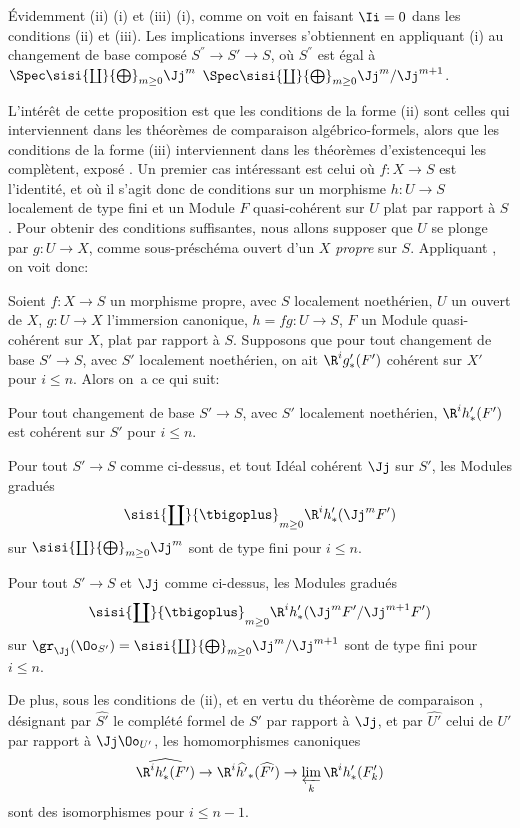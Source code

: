 \'Evidemment (ii) \ALORS (i) et (iii) \ALORS (i), comme on voit en faisant $\Ii=0$ dans les conditions (ii) et (iii). Les implications inverses s'obtiennent en appliquant (i) au changement de base compos\'e $S^{''}\to S'\to S$, o\`u $S^{''}$ est \'egal \`a $\Spec \sisi{\coprod}{\bigoplus}_{m\geq 0} \Jj^m$ \resp $\Spec \sisi{\coprod}{\bigoplus}_{m\geq 0} \Jj^m/\Jj^{m+1}$.

L'int\'er\^et de cette proposition est que les conditions de la forme (ii) sont celles qui interviennent dans les \og th\'eor\`emes de comparaison alg\'ebrico-formels\fg, alors que les conditions de la forme (iii) interviennent dans les \og th\'eor\`emes d'existence\fg qui les compl\`etent, \cf expos\'e . Un premier cas int\'eressant est celui o\`u $f:X\to S$ est l'identit\'e, et o\`u il s'agit donc de conditions sur un morphisme $h:U\to S$ localement de type fini et un Module $F$ quasi-coh\'erent sur $U$ plat par rapport \`a $S$. Pour obtenir des conditions suffisantes, nous allons supposer que $U$ se plonge par $g:U\to X$, comme sous-pr\'esch\'ema ouvert d'un $X$ \emph{propre} sur $S$. Appliquant , on voit donc:

\begin{corollaire} \label{XII.5.8}
Soient $f:X\to S$ un morphisme propre, avec $S$ localement noeth\'erien, $U$ un ouvert de $X$, $g:U\to X$ l'immersion canonique, $h=fg:U\to S$, $F$ un Module quasi-coh\'erent sur $X$, plat par rapport \`a $S$. Supposons que pour tout changement de base $S'\to S$, avec $S'$ localement noeth\'erien, on ait $\R^ig'_\ast(F')$ coh\'erent sur $X'$ pour $i\leq n$. Alors on~a ce qui suit:
\begin{enumeratei}
\item
Pour tout changement de base $S'\to S$, avec $S'$ localement noeth\'erien, $\R^ih'_\ast(F')$ est coh\'erent sur $S'$ pour $i\leq n$.
\item
Pour tout $S'\to S$ comme ci-dessus, et tout Id\'eal coh\'erent $\Jj$ sur $S'$, les Modules gradu\'es\pageoriginale
\[
\sisi{\coprod}{\tbigoplus}_{m\geq 0} \R^ih'_\ast(\Jj^mF')
\]
sur $\sisi{\coprod}{\bigoplus}_{m\geq 0}\Jj^m$ sont de type fini pour $i\leq n$.
\item
Pour tout $S'\to S$ et $\Jj$ comme ci-dessus, les Modules gradu\'es
\[
\sisi{\coprod}{\tbigoplus}_{m\geq 0} \R^ih'_\ast(\Jj^mF'/\Jj^{m+1}F')
\]
sur $\gr_\Jj(\Oo_{S'})=\sisi{\coprod}{\bigoplus}_{m\geq 0}\Jj^m/\Jj^{m+1}$ sont de type fini pour $i\leq n$.

De plus, sous les conditions de (ii), et en vertu du th\'eor\`eme de comparaison , d\'esignant par $\widehat{S'}$ le compl\'et\'e formel de $S'$ par rapport \`a $\Jj$, et par $\widehat{U'}$ celui de $U'$ par rapport \`a $\Jj\Oo_{U'}$, les homomorphismes canoniques
\[
\widehat{\R^ih'_\ast(F')} \to \R^i\widehat{h'}_\ast(\widehat{F'}) \to \varprojlim_k\R^ih'_\ast(F'_k)
\]
sont des isomorphismes pour $i\leq n-1$.
\end{enumeratei}
\end{corollaire}

